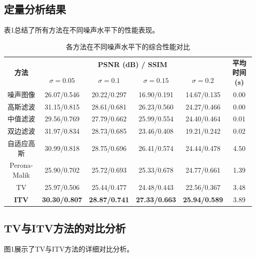 \documentclass[a4paper,12pt]{ctexart}
\begin{document}
\subsection{定量分析结果}

表1总结了所有方法在不同噪声水平下的性能表现。

\begin{table}[H]
\centering
\caption{各方法在不同噪声水平下的综合性能对比}
\label{tab:results}
\footnotesize
\begin{tabular}{|c|c|c|c|c|c|}
\hline
\multirow{2}{*}{\textbf{方法}} & \multicolumn{4}{c|}{\textbf{PSNR (dB) / SSIM}} & \multirow{2}{*}{\textbf{平均时间(s)}} \\
\cline{2-5}
 & $\sigma=0.05$ & $\sigma=0.1$ & $\sigma=0.15$ & $\sigma=0.2$ & \\
\hline
噪声图像 & 26.07/0.546 & 20.22/0.297 & 16.90/0.191 & 14.67/0.135 & 0.00 \\
\hline
高斯滤波 & 31.15/0.815 & 28.61/0.681 & 26.23/0.560 & 24.27/0.466 & 0.00 \\
\hline
中值滤波 & 29.56/0.769 & 27.79/0.662 & 25.99/0.554 & 24.40/0.464 & 0.01 \\
\hline
双边滤波 & 31.97/0.834 & 28.73/0.685 & 23.46/0.408 & 19.21/0.242 & 0.02 \\
\hline
自适应高斯 & 30.99/0.818 & 28.75/0.696 & 26.41/0.574 & 24.44/0.478 & 4.50 \\
\hline
Perona-Malik & 25.90/0.702 & 25.72/0.693 & 25.33/0.678 & 24.77/0.661 & 1.39 \\
\hline
TV & 25.97/0.506 & 25.44/0.477 & 24.48/0.443 & 22.56/0.367 & 3.48 \\
\hline
\textbf{ITV} & \textbf{30.30/0.807} & \textbf{28.87/0.741} & \textbf{27.33/0.663} & \textbf{25.94/0.589} & 3.89 \\
\hline
\end{tabular}
\end{table}

\subsection{TV与ITV方法的对比分析}

图1展示了TV与ITV方法的详细对比分析。
\end{document}
